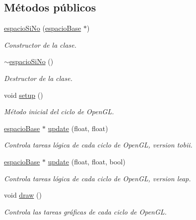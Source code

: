 \subsection*{Métodos públicos}
\begin{DoxyCompactItemize}
\item 
\hyperlink{classespacio_si_no_ae97b5c52c884882f1adfefcc0a42d6ee}{espacio\+Si\+No} (\hyperlink{classespacio_base}{espacio\+Base} $\ast$)
\begin{DoxyCompactList}\small\item\em Constructor de la clase. \end{DoxyCompactList}\item 
\hyperlink{classespacio_si_no_a57a9a2c175f12aa908e05bb32437062e}{$\sim$espacio\+Si\+No} ()
\begin{DoxyCompactList}\small\item\em Destructor de la clase. \end{DoxyCompactList}\item 
void \hyperlink{classespacio_si_no_a4094daf8c4bcc9ca7a0303fb4c41859f}{setup} ()
\begin{DoxyCompactList}\small\item\em Método inicial del ciclo de Open\+G\+L. \end{DoxyCompactList}\item 
\hyperlink{classespacio_base}{espacio\+Base} $\ast$ \hyperlink{classespacio_si_no_a07aae24ddb49581bc81bec5acd5e898c}{update} (float, float)
\begin{DoxyCompactList}\small\item\em Controla tareas lógica de cada ciclo de Open\+G\+L, version tobii. \end{DoxyCompactList}\item 
\hyperlink{classespacio_base}{espacio\+Base} $\ast$ \hyperlink{classespacio_si_no_a555ffd236af24df46604126c1dfc8e54}{update} (float, float, bool)
\begin{DoxyCompactList}\small\item\em Controla tareas lógica de cada ciclo de Open\+G\+L, version leap. \end{DoxyCompactList}\item 
void \hyperlink{classespacio_si_no_a9e413357608b8009da2f048b68220cbc}{draw} ()
\begin{DoxyCompactList}\small\item\em Controla las tareas gráficas de cada ciclo de Open\+G\+L. \end{DoxyCompactList}\end{DoxyCompactItemize}
